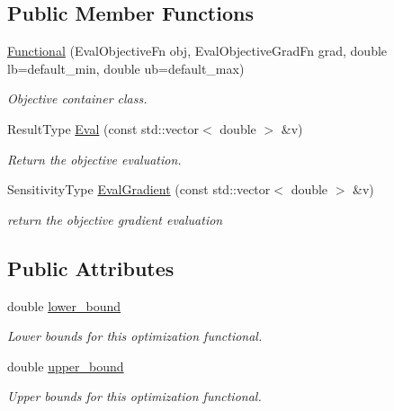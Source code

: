 \subsection*{Public Member Functions}
\begin{DoxyCompactItemize}
\item 
\hyperlink{classop_1_1Functional_a3a3dc946b4e8e4460e97de5180a1197c}{Functional} (Eval\-Objective\-Fn obj, Eval\-Objective\-Grad\-Fn grad, double lb=default\-\_\-min, double ub=default\-\_\-max)
\begin{DoxyCompactList}\small\item\em Objective container class. \end{DoxyCompactList}\item 
Result\-Type \hyperlink{classop_1_1Functional_a8e9e6e9fa0840ee70b8e8d95c44f612b}{Eval} (const std\-::vector$<$ double $>$ \&v)
\begin{DoxyCompactList}\small\item\em Return the objective evaluation. \end{DoxyCompactList}\item 
Sensitivity\-Type \hyperlink{classop_1_1Functional_a1875d79212f03c8274deeff106a19253}{Eval\-Gradient} (const std\-::vector$<$ double $>$ \&v)
\begin{DoxyCompactList}\small\item\em return the objective gradient evaluation \end{DoxyCompactList}\end{DoxyCompactItemize}
\subsection*{Public Attributes}
\begin{DoxyCompactItemize}
\item 
\hypertarget{classop_1_1Functional_a4b925783ebb3f9886cf4aea290af51e5}{double \hyperlink{classop_1_1Functional_a4b925783ebb3f9886cf4aea290af51e5}{lower\-\_\-bound}}\label{classop_1_1Functional_a4b925783ebb3f9886cf4aea290af51e5}

\begin{DoxyCompactList}\small\item\em Lower bounds for this optimization functional. \end{DoxyCompactList}\item 
\hypertarget{classop_1_1Functional_a675730c72d36a615b2dc4617b1e9dccd}{double \hyperlink{classop_1_1Functional_a675730c72d36a615b2dc4617b1e9dccd}{upper\-\_\-bound}}\label{classop_1_1Functional_a675730c72d36a615b2dc4617b1e9dccd}

\begin{DoxyCompactList}\small\item\em Upper bounds for this optimization functional. \end{DoxyCompactList}\end{DoxyCompactItemize}
